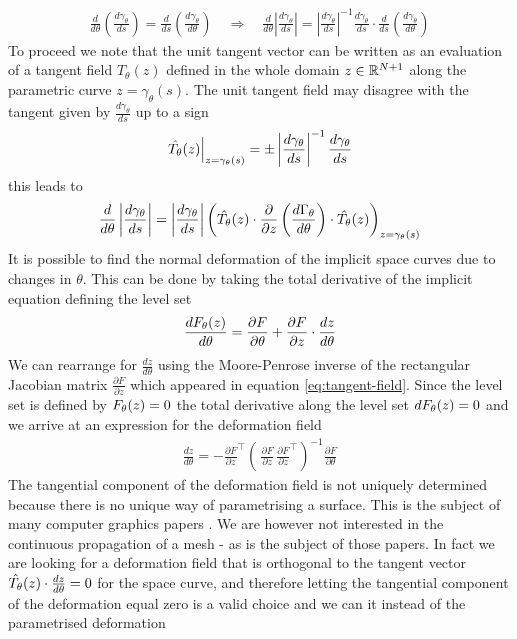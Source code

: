 \begin{align}
    \frac{d}{d\theta}\left(\frac{d\gamma_{\theta}}{ds}\right)
    = \frac{d}{ds}\left(\frac{d\gamma_{\theta}}{d\theta}\right)
    \quad\Rightarrow\quad
    \frac{d}{d\theta}\left|\frac{d\gamma_{\theta}}{ds}\right|=
    \left|\frac{d\gamma_{\theta}}{ds}\right|^{-1}
    \frac{d\gamma_{\theta}}{ds}\cdot\frac{d}{d s}
    \left(\frac{d\gamma_{\theta}}{d\theta}\right)
\end{align}
To proceed we note that the unit tangent vector can be written as an evaluation of a tangent field $\hat{T}_{\theta}(z)$ defined in the whole domain $z\in\mathbb{R}^{N+1}$ along the parametric curve $z=\gamma_{\theta}(s)$. The unit tangent field may disagree with the tangent given by $\frac{d\gamma_{\theta}}{ds}$ up to a sign
\begin{align}
    \left.\hat{T_{\theta}}(z)\right|_{z=\gamma_{\theta}(s)}=
    \pm\left|\frac{d\gamma_{\theta}}{ds}\right|^{-1}\frac{d\gamma_{\theta}}{d s}
\end{align}
this leads to
\begin{align}
    \frac{d}{d\theta}\left|\frac{d\gamma_{\theta}}{ds}\right|=
    \left|\frac{d\gamma_{\theta}}{ds}\right|\left(
   \hat{T_{\theta}}(z)\cdot\frac{\partial }{\partial z}\left(\frac{d\Gamma_{\theta}}{d \theta}\right)\cdot
   \hat{T_{\theta}}(z)
    \right)_{z=\gamma_\theta(s)}
    \label{eq:divergence-term}
\end{align}
It is possible to find the normal deformation of the implicit space curves due to changes in $\theta$. This can be done by taking the total derivative of the implicit equation defining the level set
\begin{align}
    \frac{dF_{\theta}(z)}{d\theta}=\frac{\partial F}{\partial\theta}+
    \frac{\partial F}{\partial z}\cdot\frac{d z}{d \theta}
\end{align}
We can rearrange for $\frac{d z}{d \theta}$ using the Moore-Penrose inverse of the rectangular Jacobian matrix $\frac{\partial F}{\partial z}$ which appeared in equation \eqref{eq:tangent-field}. Since the level set is defined by $F_{\theta}(z)=0$ the total derivative along the level set $dF_{\theta}(z)=0$ and we arrive at an expression for the deformation field \cite{Jos2011OnSurface}
\begin{align}
    \frac{d z}{d \theta} = - \frac{\partial F}{\partial z}^\top
    \left(\,
        \frac{\partial F}{\partial z}\,\frac{\partial F}{\partial z}^\top
    \right)^{-1}
    \frac{\partial F}{\partial\theta}
\end{align}
The tangential component of the deformation field is not uniquely determined because there is no unique way of parametrising a surface. This is the subject of many computer graphics papers \cite{Jos2011OnSurface,Tao2016Near-IsometricTracking,Fujisawa2013CalculationInvariance}. We are however not interested in the continuous propagation of a mesh - as is the subject of those papers. In fact we are looking for a deformation field that is orthogonal to the tangent vector $\hat{T_{\theta}}(z) \cdot\frac{d z}{d\theta} =0$ for the space curve, and therefore letting the tangential component of the deformation equal zero is a valid choice and we can it instead of the parametrised deformation

